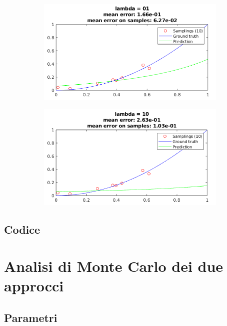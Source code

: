 \documentclass[12pt]{article}
\begin{document}
\begin{figure}[H]
  \centering
  \begin{subfigure}{0.45\textwidth}
    \includegraphics[width=\textwidth]{plots/regression_lambda/lambda_eq_1.png}
  \end{subfigure}
  \begin{subfigure}{0.45\textwidth}
    \includegraphics[width=\textwidth]{plots/regression_lambda/lambda_eq_10.png}
  \end{subfigure}
\end{figure}

\newpage
\subsection{Codice}


\newpage
\section{Analisi di Monte Carlo dei due approcci}

\subsection{Parametri}
\end{document}
